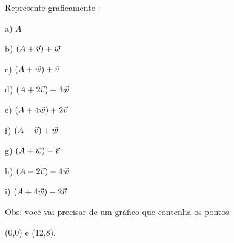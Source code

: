 \documentclass[oneside,12pt]{article}
\begin{document}
Represente graficamente :

a) $A$

b) $(A+{\vec v})+{\vec w}$

c) $(A+{\vec w})+{\vec v}$

d) $(A+2{\vec v})+4{\vec w}$

e) $(A+4{\vec w})+2{\vec v}$

f) $(A-{\vec v})+{\vec w}$

g) $(A+{\vec w})-{\vec v}$

h) $(A-2{\vec v})+4{\vec w}$

i) $(A+4{\vec w})-2{\vec v}$

\msk

Obs: você vai precisar de um gráfico que contenha os pontos

(0,0) e (12,8).




\end{document}
